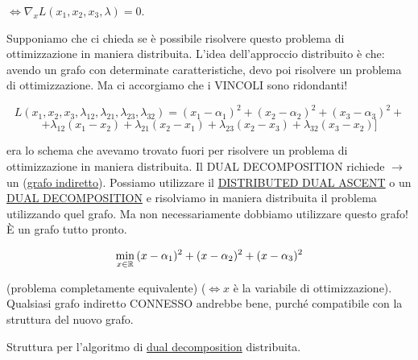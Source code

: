 $\iff \nabla_x{L(x_1,x_2,x_3,\lambda)} = 0$.

Supponiamo che ci chieda se è possibile risolvere questo problema di ottimizzazione in maniera distribuita. L'idea dell'approccio distribuito è che: avendo un grafo con determinate caratteristiche, devo poi risolvere un problema di ottimizzazione.
Ma ci accorgiamo che i VINCOLI sono ridondanti!

\[
	L(x_1,x_2,x_3,\lambda_{12},\lambda_{21},\lambda_{23},\lambda_{32}) = (x_1-\alpha_1)^2 + (x_2-\alpha_2)^2 + (x_3-\alpha_3)^2 +
\]
\[
	+ \lambda_{12}(x_1-x_2) + \lambda_{21}(x_2-x_1) + \lambda_{23}(x_2-x_3) + \lambda_{32}(x_3-x_2)]
\]

era lo schema che avevamo trovato fuori per risolvere un problema di ottimizzazione in maniera distribuita. Il DUAL DECOMPOSITION richiede $\rightarrow$ un (\underline{grafo indiretto}). Possiamo utilizzare il \underline{DISTRIBUTED DUAL ASCENT} o un \underline{DUAL DECOMPOSITION} e risolviamo in maniera distribuita il problema utilizzando quel grafo. Ma non necessariamente dobbiamo utilizzare questo grafo! \`E un grafo tutto pronto.

\[
	\min_{x\in\mathbb{R}}{(x-\alpha_1)^2 + (x-\alpha_2)^2 + (x-\alpha_3)^2}
\]

(problema completamente equivalente) ($\iff x$ è la variabile di ottimizzazione). Qualsiasi grafo indiretto CONNESSO andrebbe bene, purché compatibile con la struttura del nuovo grafo.

Struttura per l'algoritmo di \underline{dual decomposition} distribuita.